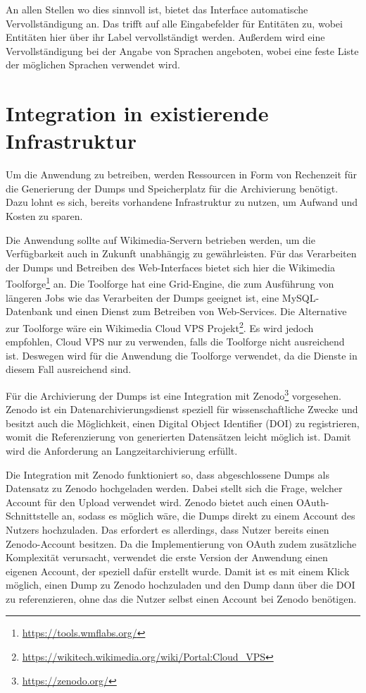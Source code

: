 An allen Stellen wo dies sinnvoll ist, bietet das Interface automatische Vervollständigung an.
Das trifft auf alle Eingabefelder für Entitäten zu, wobei Entitäten hier über ihr Label vervollständigt werden.
Außerdem wird eine Vervollständigung bei der Angabe von Sprachen angeboten, wobei eine feste Liste der möglichen Sprachen verwendet wird.

\section{Integration in existierende Infrastruktur}
Um die Anwendung zu betreiben, werden Ressourcen in Form von Rechenzeit für die Generierung der Dumps und Speicherplatz für die Archivierung benötigt.
Dazu lohnt es sich, bereits vorhandene Infrastruktur zu nutzen, um Aufwand und Kosten zu sparen.

Die Anwendung sollte auf Wikimedia-Servern betrieben werden, um die Verfügbarkeit auch in Zukunft unabhängig zu gewährleisten.
Für das Verarbeiten der Dumps und Betreiben des Web-Interfaces bietet sich hier die Wikimedia Toolforge\footnote{\url{https://tools.wmflabs.org/}} an.
Die Toolforge hat eine Grid-Engine, die zum Ausführung von längeren Jobs wie das Verarbeiten der Dumps geeignet ist, eine MySQL-Datenbank und einen Dienst zum Betreiben von Web-Services.
Die Alternative zur Toolforge wäre ein Wikimedia Cloud VPS Projekt\footnote{\url{https://wikitech.wikimedia.org/wiki/Portal:Cloud_VPS}}.
Es wird jedoch empfohlen, Cloud VPS nur zu verwenden, falls die Toolforge nicht ausreichend ist.
Deswegen wird für die Anwendung die Toolforge verwendet, da die Dienste in diesem Fall ausreichend sind.

Für die Archivierung der Dumps ist eine Integration mit Zenodo\footnote{\url{https://zenodo.org/}} vorgesehen.
Zenodo ist ein Datenarchivierungsdienst speziell für wissenschaftliche Zwecke und besitzt auch die Möglichkeit, einen Digital Object Identifier (DOI) zu registrieren, womit die Referenzierung von generierten Datensätzen leicht möglich ist.
Damit wird die Anforderung an Langzeitarchivierung erfüllt. 

Die Integration mit Zenodo funktioniert so, dass abgeschlossene Dumps als Datensatz zu Zenodo hochgeladen werden.
Dabei stellt sich die Frage, welcher Account für den Upload verwendet wird.
Zenodo bietet auch einen OAuth-Schnittstelle an, sodass es möglich wäre, die Dumps direkt zu einem Account des Nutzers hochzuladen.
Das erfordert es allerdings, dass Nutzer bereits einen Zenodo-Account besitzen.
Da die Implementierung von OAuth zudem zusätzliche Komplexität verursacht, verwendet die erste Version der Anwendung einen eigenen Account, der speziell dafür erstellt wurde.
Damit ist es mit einem Klick möglich, einen Dump zu Zenodo hochzuladen und den Dump dann über die DOI zu referenzieren, ohne das die Nutzer selbst einen Account bei Zenodo benötigen.